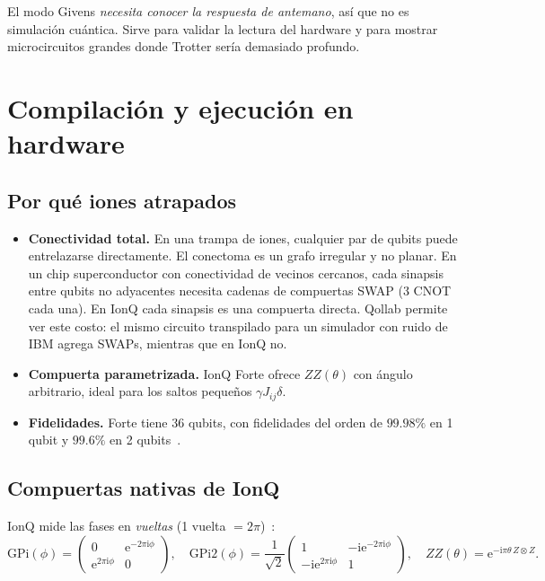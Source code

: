 \documentclass[11pt,a4paper]{article}
\newcommand{\e}{\mathrm{e}}
\newcommand{\ii}{\mathrm{i}}
\theoremstyle{plain}
\theoremstyle{definition}
\theoremstyle{remark}
\begin{document}
\begin{honestidad}
El modo Givens \emph{necesita conocer la respuesta de antemano}, así que no es simulación cuántica. Sirve para validar la lectura del hardware y para mostrar microcircuitos grandes donde Trotter sería demasiado profundo.
\end{honestidad}

\section{Compilación y ejecución en hardware}
\label{sec:compilacion}

\subsection{Por qué iones atrapados}

\begin{itemize}
\item \textbf{Conectividad total.} En una trampa de iones, cualquier par de qubits puede entrelazarse directamente. El conectoma es un grafo irregular y no planar. En un chip superconductor con conectividad de vecinos cercanos, cada sinapsis entre qubits no adyacentes necesita cadenas de compuertas SWAP (3 CNOT cada una). En IonQ cada sinapsis es una compuerta directa. Qollab permite ver este costo: el mismo circuito transpilado para un simulador con ruido de IBM agrega SWAPs, mientras que en IonQ no.
\item \textbf{Compuerta parametrizada.} IonQ Forte ofrece $ZZ(\theta)$ con ángulo arbitrario, ideal para los saltos pequeños $\gamma J_{ij}\delta$.
\item \textbf{Fidelidades.} Forte tiene 36 qubits, con fidelidades del orden de $99.98\%$ en 1 qubit y $99.6\%$ en 2 qubits~\cite{ionqcompare}.
\end{itemize}

\subsection{Compuertas nativas de IonQ}

IonQ mide las fases en \emph{vueltas} (1 vuelta $=2\pi$)~\cite{ionqnative}:
\begin{equation}
\mathrm{GPi}(\phi)=\begin{pmatrix}0&\e^{-2\pi\ii\phi}\\\e^{2\pi\ii\phi}&0\end{pmatrix},\quad
\mathrm{GPi2}(\phi)=\frac1{\sqrt2}\begin{pmatrix}1&-\ii\e^{-2\pi\ii\phi}\\-\ii\e^{2\pi\ii\phi}&1\end{pmatrix},\quad
ZZ(\theta)=\e^{-\ii\pi\theta\,Z\otimes Z}.
\end{equation}
\end{document}
